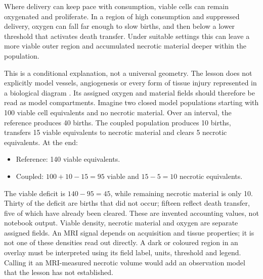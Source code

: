 \biomedicalanswer
{}
Where delivery can keep pace with consumption, viable cells can remain oxygenated and proliferate. In a region of high consumption and suppressed delivery, oxygen can fall far enough to slow births, and then below a lower threshold that activates death transfer. Under suitable settings this can leave a more viable outer region and accumulated necrotic material deeper within the population.

This is a conditional explanation, not a universal geometry. The lesson does not explicitly model vessels, angiogenesis or every form of tissue injury represented in a biological diagram \citep{comba2021heterogeneity}. Its assigned oxygen and material fields should therefore be read as model compartments.
Imagine two closed model populations starting with 100 viable cell equivalents and no necrotic material. Over an interval, the reference produces 40 births. The coupled population produces 10 births, transfers 15 viable equivalents to necrotic material and clears 5 necrotic equivalents. At the end:
\begin{itemize}
\item Reference: 140 viable equivalents.
\item Coupled: $100+10-15=95$ viable and $15-5=10$ necrotic equivalents.
\end{itemize}
The viable deficit is $140-95=45$, while remaining necrotic material is only 10. Thirty of the deficit are births that did not occur; fifteen reflect death transfer, five of which have already been cleared. These are invented accounting values, not notebook output.
Viable density, necrotic material and oxygen are separate assigned fields. An MRI signal depends on acquisition and tissue properties; it is not one of these densities read out directly. A dark or coloured region in an overlay must be interpreted using its field label, units, threshold and legend. Calling it an MRI-measured necrotic volume would add an observation model that the lesson has not established.

